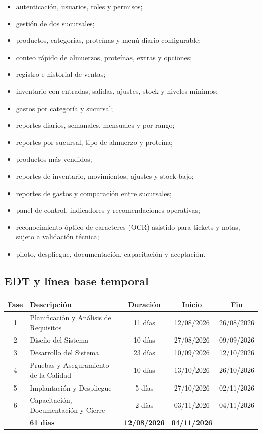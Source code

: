 \documentclass[12pt,a4paper]{article}
\begin{document}
\begin{itemize}
    \item autenticación, usuarios, roles y permisos;
    \item gestión de dos sucursales;
    \item productos, categorías, proteínas y menú diario configurable;
    \item conteo rápido de almuerzos, proteínas, extras y opciones;
    \item registro e historial de ventas;
    \item inventario con entradas, salidas, ajustes, stock y niveles mínimos;
    \item gastos por categoría y sucursal;
    \item reportes diarios, semanales, mensuales y por rango;
    \item reportes por sucursal, tipo de almuerzo y proteína;
    \item productos más vendidos;
    \item reportes de inventario, movimientos, ajustes y stock bajo;
    \item reportes de gastos y comparación entre sucursales;
    \item panel de control, indicadores y recomendaciones operativas;
    \item reconocimiento óptico de caracteres (OCR) asistido para tickets y notas, sujeto a validación técnica;
    \item piloto, despliegue, documentación, capacitación y aceptación.
\end{itemize}

\subsection{EDT y línea base temporal}

\begin{center}
\renewcommand{\arraystretch}{1.18}
\begin{tabularx}{\textwidth}{|c|X|c|c|c|}
\hline
\rowcolor{tableheader}
\textbf{Fase} & \textbf{Descripción} & \textbf{Duración} & \textbf{Inicio} & \textbf{Fin} \\ \hline
1 & Planificación y Análisis de Requisitos & 11 días & 12/08/2026 & 26/08/2026 \\ \hline
2 & Diseño del Sistema & 10 días & 27/08/2026 & 09/09/2026 \\ \hline
3 & Desarrollo del Sistema & 23 días & 10/09/2026 & 12/10/2026 \\ \hline
4 & Pruebas y Aseguramiento de la Calidad & 10 días & 13/10/2026 & 26/10/2026 \\ \hline
5 & Implantación y Despliegue & 5 días & 27/10/2026 & 02/11/2026 \\ \hline
6 & Capacitación, Documentación y Cierre & 2 días & 03/11/2026 & 04/11/2026 \\ \hline
\rowcolor{headergray}
\multicolumn{2}{|l|}{\textbf{PROYECTO COMPLETO}} & \textbf{61 días} & \textbf{12/08/2026} & \textbf{04/11/2026} \\ \hline
\end{tabularx}
\end{center}
\end{document}
